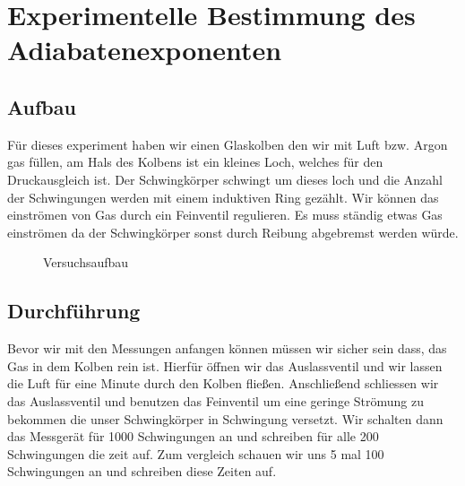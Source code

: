 \documentclass[11pt,a4paper]{article}
\begin{document}
\section{Experimentelle Bestimmung des Adiabatenexponenten}
\subsection{Aufbau}

Für dieses experiment haben wir einen Glaskolben den wir mit Luft bzw. Argon gas füllen, am Hals des Kolbens ist ein kleines Loch, welches für den Druckausgleich ist. Der Schwingkörper schwingt um dieses loch und die Anzahl der Schwingungen werden mit einem induktiven Ring gezählt. Wir können das einströmen von Gas durch ein Feinventil regulieren. Es muss ständig etwas Gas einströmen da der Schwingkörper sonst durch Reibung abgebremst werden würde.  

\begin{figure}[h]
\centering
{}
   \renewcommand\thefigure{B1}
\caption{Versuchsaufbau}
\label{JS1}
\end{figure}

\subsection{Durchführung}

Bevor wir mit den Messungen anfangen können müssen wir sicher sein dass, das Gas in dem Kolben rein ist. Hierfür öffnen wir das Auslassventil und wir lassen die Luft für eine Minute durch den Kolben fließen. Anschließend schliessen wir das Auslassventil und benutzen das Feinventil um eine geringe Strömung zu bekommen die unser Schwingkörper in Schwingung versetzt. Wir schalten dann das Messgerät für 1000 Schwingungen an und schreiben für alle 200 Schwingungen die zeit auf. Zum vergleich schauen wir uns 5 mal 100 Schwingungen an und schreiben diese Zeiten auf. 
\end{document}
